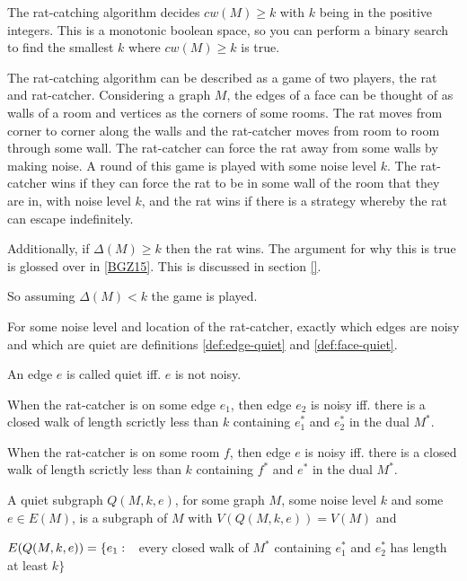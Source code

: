 \documentclass{article}
\begin{document}
	The rat-catching algorithm decides $cw(M) \geq k$ with $k$ being in the positive integers. This is a monotonic boolean space, so you can perform a binary search to find the smallest $k$ where $cw(M) \geq k$ is true.

	The rat-catching algorithm can be described as a game of two players, the rat and rat-catcher. Considering a graph $M$, the edges of a face can be thought of as walls of a room and vertices as the corners of some rooms. The rat moves from corner to corner along the walls and the rat-catcher moves from room to room through some wall. The rat-catcher can force the rat away from some walls by making noise. A round of this game is played with some noise level $k$. The rat-catcher wins if they can force the rat to be in some wall of the room that they are in, with noise level $k$, and the rat wins if there is a strategy whereby the rat can escape indefinitely.

	Additionally, if $\Delta(M) \geq k$ then the rat wins. The argument for why this is true is glossed over in \ref{BGZ15}. This is discussed in section \ref{}.

	So assuming $\Delta(M) < k$ the game is played.

	For some noise level and location of the rat-catcher, exactly which edges are noisy and which are quiet are definitions \ref{def:edge-quiet} and \ref{def:face-quiet}.

	An edge $e$ is called quiet iff. $e$ is not noisy.

	\begin{definition}\label{def:edge-quiet}
		When the rat-catcher is on some edge $e_1$, then edge $e_2$ is noisy iff. there is a closed walk of length scrictly less than $k$ containing $e_1^*$ and $e_2^*$ in the dual $M^*$.
	\end{definition}

	\begin{definition}\label{def:face-quiet}
		When the rat-catcher is on some room $f$, then edge $e$ is noisy iff. there is a closed walk of length scrictly less than $k$ containing $f^*$ and $e^*$ in the dual $M^*$.
	\end{definition}

	A quiet subgraph $Q(M, k, e)$, for some graph $M$, some noise level $k$ and some $e \in E(M)$, is a subgraph of $M$ with $V(Q(M, k, e)) = V(M)$ and

	$E(Q(M, k, e)) = \{e_1 \,\colon\  $ every closed walk of $M^*$ containing $e_1^*$ and $e_2^*$ has length at least $k\}$
\end{document}
